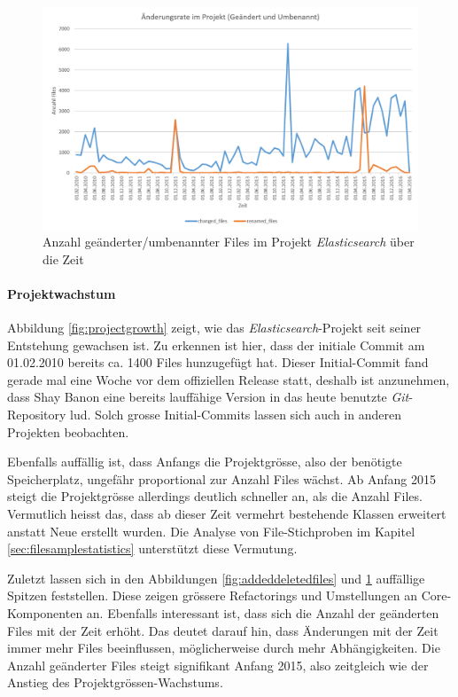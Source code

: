 \documentclass[10pt, a4paper]{article}
\begin{document}
\begin{figure}[!ht]
	\centering
	\includegraphics[width=1\textwidth]{resources/images/chart_project_change_rate_2.png}
	\caption{Anzahl geänderter/umbenannter Files im Projekt \emph{Elasticsearch} über die Zeit}
	\label{fig:changedrenamedfiles}
\end{figure}

\paragraph{Projektwachstum} Abbildung \ref{fig:projectgrowth} zeigt, wie das \emph{Elasticsearch}-Projekt seit seiner Entstehung gewachsen ist. Zu erkennen ist hier, dass der initiale Commit am 01.02.2010 bereits ca. 1400 Files hunzugefügt hat. Dieser Initial-Commit fand gerade mal eine Woche vor dem offiziellen Release \cite{elasticsearchrelease} statt, deshalb ist anzunehmen, dass Shay Banon eine bereits lauffähige Version in das heute benutzte \emph{Git}-Repository lud. Solch grosse Initial-Commits lassen sich auch in anderen Projekten beobachten.

Ebenfalls auffällig ist, dass Anfangs die Projektgrösse, also der benötigte Speicherplatz, ungefähr proportional zur Anzahl Files wächst. Ab Anfang 2015 steigt die Projektgrösse allerdings deutlich schneller an, als die Anzahl Files. Vermutlich heisst das, dass ab dieser Zeit vermehrt bestehende Klassen erweitert anstatt Neue erstellt wurden. Die Analyse von File-Stichproben im Kapitel \ref{sec:filesamplestatistics} unterstützt diese Vermutung.

Zuletzt lassen sich in den Abbildungen \ref{fig:addeddeletedfiles} und \ref{fig:changedrenamedfiles} auffällige Spitzen feststellen. Diese zeigen grössere Refactorings und Umstellungen an Core-Komponenten an. Ebenfalls interessant ist, dass sich die Anzahl der geänderten Files mit der Zeit erhöht. Das deutet darauf hin, dass Änderungen mit der Zeit immer mehr Files beeinflussen, möglicherweise durch mehr Abhängigkeiten. Die Anzahl geänderter Files steigt signifikant Anfang 2015, also zeitgleich wie der Anstieg des Projektgrössen-Wachstums.
\end{document}
